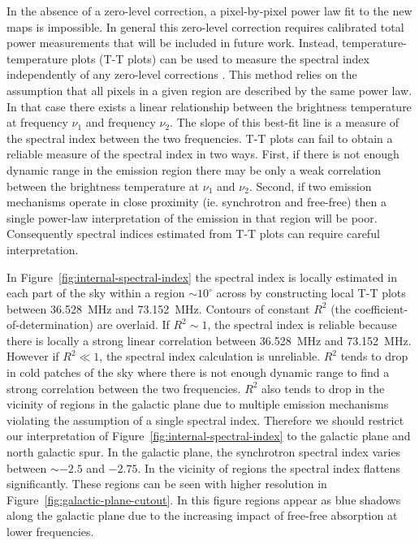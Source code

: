 \documentclass[twocolumn]{aastex61}
\begin{document}
In the absence of a zero-level correction, a pixel-by-pixel power law fit to the new maps is
impossible. In general this zero-level correction requires calibrated total power measurements that
will be included in future work.  Instead, temperature-temperature plots (T-T plots) can be used to
measure the spectral index independently of any zero-level corrections \citep{1962MNRAS.124..297T}.
This method relies on the assumption that all pixels in a given region are described by the same
power law. In that case there exists a linear relationship between the brightness temperature at
frequency $\nu_1$ and frequency $\nu_2$. The slope of this best-fit line is a measure of the
spectral index between the two frequencies. T-T plots can fail to obtain a reliable measure of the
spectral index in two ways.  First, if there is not enough dynamic range in the emission region
there may be only a weak correlation between the brightness temperature at $\nu_1$ and $\nu_2$.
Second, if two emission mechanisms operate in close proximity (ie.  synchrotron and free-free) then
a single power-law interpretation of the emission in that region will be poor. Consequently spectral
indices estimated from T-T plots can require careful interpretation.

In Figure~\ref{fig:internal-spectral-index} the spectral index is locally estimated in each part of
the sky within a region $\sim10^\circ$ across by constructing local T-T plots between 36.528~MHz and
73.152~MHz. Contours of constant $R^2$ (the coefficient-of-determination) are overlaid. If $R^2\sim
1$, the spectral index is reliable because there is locally a strong linear correlation between
36.528~MHz and 73.152~MHz. However if $R^2\ll 1$, the spectral index calculation is unreliable.
$R^2$ tends to drop in cold patches of the sky where there is not enough dynamic range to find a
strong correlation between the two frequencies. $R^2$ also tends to drop in the vicinity of
 regions in the galactic plane due to multiple emission mechanisms violating the
assumption of a single spectral index. Therefore we should restrict our interpretation of
Figure~\ref{fig:internal-spectral-index} to the galactic plane and north galactic spur. In the
galactic plane, the synchrotron spectral index varies between $\sim-2.5$ and $-2.75$. In the
vicinity of  regions the spectral index flattens significantly.  These  regions
can be seen with higher resolution in Figure~\ref{fig:galactic-plane-cutout}. In this figure
 regions appear as blue shadows along the galactic plane due to the increasing impact of
free-free absorption at lower frequencies.
\end{document}
